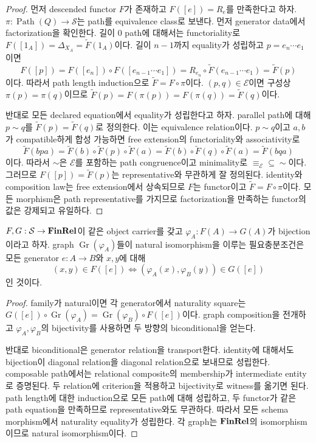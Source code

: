 \begin{proof}
먼저 descended functor $F$가 존재하고 $F([e])=R_e$를 만족한다고 하자.
$\pi:\operatorname{Path}(Q)\to\mathcal S$는 path를 equivalence
class로 보낸다. 먼저 generator data에서 factorization을 확인한다. 길이 0
path에 대해서는 functoriality로
$F([1_A])=\Delta_{X_A}=\widetilde F(1_A)$이다. 길이 $n-1$까지 equality가
성립하고 $p=e_n\cdots e_1$이면
\[
F([p])=F([e_n])\circ F([e_{n-1}\cdots e_1])
=R_{e_n}\circ\widetilde F(e_{n-1}\cdots e_1)=\widetilde F(p)
\]
이다. 따라서 path length induction으로 $\widetilde F=F\circ\pi$이다.
$(p,q)\in\mathcal E$이면 구성상
$\pi(p)=\pi(q)$이므로
$\widetilde F(p)=F(\pi(p))=F(\pi(q))=\widetilde F(q)$이다.

반대로 모든 declared equation에서 equality가 성립한다고 하자. parallel
path에 대해 $p\sim q$를 $\widetilde F(p)=\widetilde F(q)$로 정의한다.
이는 equivalence relation이다. $p\sim q$이고 $a,b$가 compatible하게
합성 가능하면 free extension의 functoriality와 associativity로
\[
 \widetilde F(bpa)
 =\widetilde F(b)\circ\widetilde F(p)\circ\widetilde F(a)
 =\widetilde F(b)\circ\widetilde F(q)\circ\widetilde F(a)
 =\widetilde F(bqa)
\]
이다. 따라서 $\sim$은 $\mathcal E$를 포함하는 path congruence이고
minimality로 $\equiv_{\mathcal E}\subseteq\sim$이다. 그러므로
$F([p])=\widetilde F(p)$는 representative와 무관하게 잘 정의된다.
identity와 composition law는 free extension에서 상속되므로 $F$는 functor이고
$\widetilde F=F\circ\pi$이다. 모든 morphism은 path representative를
가지므로 factorization을 만족하는 functor의 값은 강제되고 유일하다.
\end{proof}

\begin{proposition}
$F,G:\mathcal S\to\mathbf{FinRel}$이 같은 object carrier를 갖고
$\varphi_A:F(A)\to G(A)$가 bijection이라고 하자.
graph $\operatorname{Gr}(\varphi_A)$들이 natural isomorphism을 이루는
필요충분조건은 모든 generator $e:A\to B$와 $x,y$에 대해
\[
 (x,y)\in F([e])
 \Longleftrightarrow
 (\varphi_A(x),\varphi_B(y))\in G([e])
\]
인 것이다.
\end{proposition}

\begin{proof}
family가 natural이면 각 generator에서 naturality square는
$G([e])\circ\operatorname{Gr}(\varphi_A)
=\operatorname{Gr}(\varphi_B)\circ F([e])$이다. graph composition을 전개하고 $\varphi_A,\varphi_B$의 bijectivity를 사용하면
두 방향의 biconditional을 얻는다.

반대로 biconditional은 generator relation을 transport한다. identity에 대해서도
bijection이 diagonal relation을 diagonal relation으로 보내므로 성립한다.
composable path에서는 relational composite의 membership가 intermediate
entity로 증명된다. 두 relation에 criterion을 적용하고 bijectivity로 witness를
옮기면 된다. path length에 대한 induction으로 모든 path에 대해 성립하고,
두 functor가 같은 path equation을 만족하므로 representative와도 무관하다.
따라서 모든 schema morphism에서 naturality equality가 성립한다. 각 graph는
$\mathbf{FinRel}$의 isomorphism이므로 natural isomorphism이다.
\end{proof}

